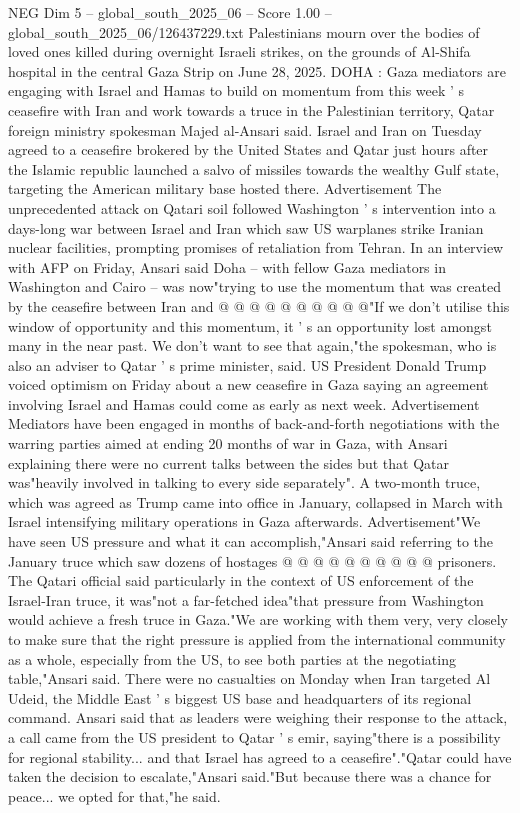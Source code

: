 \begin{textsample}{NEG Dim 5 – global\_south\_2025\_06 – Score 1.00 – global\_south\_2025\_06/126437229.txt}  \label{ex:f5_neg_396}
Palestinians mourn over the bodies of loved ones killed during overnight Israeli strikes, on the grounds of Al-Shifa hospital in the central Gaza Strip on June 28, 2025.
DOHA : Gaza mediators are engaging with Israel and Hamas to build on momentum from this week ' s ceasefire with Iran and work towards a truce in the Palestinian territory, Qatar foreign ministry spokesman Majed al-Ansari said.
Israel and Iran on Tuesday agreed to a ceasefire brokered by the United States and Qatar just hours after the Islamic republic launched a salvo of missiles towards the wealthy Gulf state, targeting the American military base hosted there.
Advertisement The unprecedented attack on Qatari soil followed Washington ' s intervention into a days-long war between Israel and Iran which saw US warplanes strike Iranian nuclear facilities, prompting promises of retaliation from Tehran.
In an interview with AFP on Friday, Ansari said Doha -- with fellow Gaza mediators in Washington and Cairo -- was now"trying to use the momentum that was created by the ceasefire between Iran and @ @ @ @ @ @ @ @ @ @"If we don't utilise this window of opportunity and this momentum, it ' s an opportunity lost amongst many in the near past.
We don't want to see that again,"the spokesman, who is also an adviser to Qatar ' s prime minister, said.
US President Donald Trump voiced optimism on Friday about a new ceasefire in Gaza saying an agreement involving Israel and Hamas could come as early as next week.
Advertisement Mediators have been engaged in months of back-and-forth negotiations with the warring parties aimed at ending 20 months of war in Gaza, with Ansari explaining there were no current talks between the sides but that Qatar was"heavily involved in talking to every side separately".
A two-month truce, which was agreed as Trump came into office in January, collapsed in March with Israel intensifying military operations in Gaza afterwards.
Advertisement"We have seen US pressure and what it can accomplish,"Ansari said referring to the January truce which saw dozens of hostages @ @ @ @ @ @ @ @ @ @ prisoners.
The Qatari official said particularly in the context of US enforcement of the Israel-Iran truce, it was"not a far-fetched idea"that pressure from Washington would achieve a fresh truce in Gaza."We are working with them very, very closely to make sure that the right pressure is applied from the international community as a whole, especially from the US, to see both parties at the negotiating table,"Ansari said.
There were no casualties on Monday when Iran targeted Al Udeid, the Middle East ' s biggest US base and headquarters of its regional command.
Ansari said that as leaders were weighing their response to the attack, a call came from the US president to Qatar ' s emir, saying"there is a possibility for regional stability... and that Israel has agreed to a ceasefire"."Qatar could have taken the decision to escalate,"Ansari said."But because there was a chance for peace... we opted for that,"he said.

\end{textsample}
